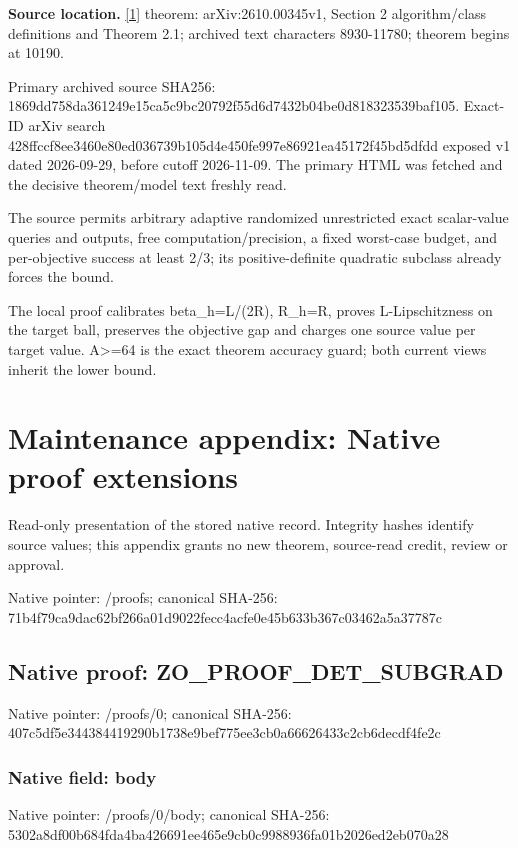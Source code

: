 \documentclass[10pt,a4paper]{article}
\begin{document}
\textbf{Source location.} \href{https://arxiv.org/html/2610.00345v1}{[1]} theorem: arXiv:2610.00345v1, Section 2 algorithm/class definitions and Theorem 2.1; archived text characters 8930-11780; theorem begins at 10190.

Primary archived source SHA256: 1869dd758da361249e15ca5c9bc20792f55d6d7432b04be0d818323539baf105. Exact-ID arXiv search 428ffccf8ee3460e80ed036739b105d4e450fe997e86921ea45172f45bd5dfdd exposed v1 dated 2026-09-29, before cutoff 2026-11-09. The primary HTML was fetched and the decisive theorem/model text freshly read.

The source permits arbitrary adaptive randomized unrestricted exact scalar-value queries and outputs, free computation/precision, a fixed worst-case budget, and per-objective success at least 2/3; its positive-definite quadratic subclass already forces the bound.

The local proof calibrates beta\_\allowbreak{}h=L/(2R), R\_\allowbreak{}h=R, proves L-Lipschitzness on the target ball, preserves the objective gap and charges one source value per target value. A>=64 is the exact theorem accuracy guard; both current views inherit the lower bound.

\section{Maintenance appendix: Native proof extensions}
Read-only presentation of the stored native record. Integrity hashes identify source values; this appendix grants no new theorem, source-read credit, review or approval.

Native pointer: /proofs; canonical SHA-256: 71b4f79ca9dac62bf266a01d9022fecc4acfe0e45b633b367c03462a5a37787c

\subsection{Native proof: ZO\_\allowbreak{}PROOF\_\allowbreak{}DET\_\allowbreak{}SUBGRAD}
Native pointer: /proofs/0; canonical SHA-256: 407c5df5e344384419290b1738e9bef775ee3cb0a66626433c2cb6decdf4fe2c

\subsubsection{Native field: body}
Native pointer: /proofs/0/body; canonical SHA-256: 5302a8df00b684fda4ba426691ee465e9cb0c9988936fa01b2026ed2eb070a28
\end{document}
